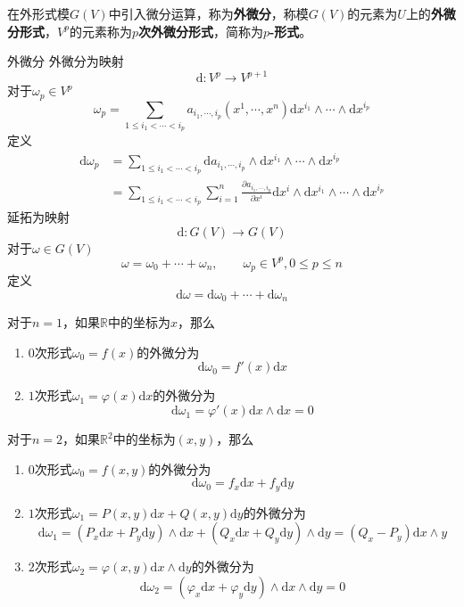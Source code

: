 \documentclass[lang = cn, scheme = chinese, thmcnt = section]{elegantbook}
\newcommand{\R}{\mathbb{R}}            %
\newcommand{\dd}{\mathrm{d}}           %
\begin{document}
在外形式模$G(V)$中引入微分运算，称为\textbf{外微分}，称模$G(V)$的元素为$U$上的\textbf{外微分形式}，$V^p$的元素称为\textbf{$p$次外微分形式}，简称为\textbf{$p$-形式}。

\begin{definition}{外微分}
	外微分为映射%
	$$
	\dd:V^p\to V^{p+1}
	$$
	对于$\omega_p\in V^p$%
	$$
	\omega_p=\sum_{1\le i_1<\cdots<i_p}a_{i_1,\cdots,i_p}(x^1,\cdots,x^n)\dd x^{i_1}\wedge\cdots\wedge\dd x^{i_p}
	$$
	定义%
	\begin{align*}
		\dd\omega_p
		& = \sum_{1\le i_1<\cdots<i_p}\dd a_{i_1,\cdots,i_p}\wedge\dd x^{i_1}\wedge\cdots\wedge\dd x^{i_p}\\
		& = \sum_{1\le i_1<\cdots<i_p}\sum_{i=1}^{n}\frac{\partial a_{i_1,\cdots,i_p}}{\partial x^i}\dd x^i\wedge\dd x^{i_1}\wedge\cdots\wedge\dd x^{i_p}
	\end{align*}
	延拓为映射
	$$
	\dd:G(V)\to G(V)
	$$
	对于$\omega\in G(V)$%
	$$
	\omega=\omega_0+\cdots+\omega_n,\qquad \omega_p\in V^p,0\le p \le n
	$$
	定义%
	$$
	\dd\omega=\dd\omega_0+\cdots+\dd\omega_n
	$$
\end{definition}

\begin{example}
	对于$n=1$，如果$\R$中的坐标为$x$，那么
	\begin{enumerate}
		\item $0$次形式$\omega_0=f(x)$的外微分为%
		$$
		\dd\omega_0=f'(x)\dd x
		$$
		\item $1$次形式$\omega_1=\varphi(x)\dd x$的外微分为%
		$$
		\dd\omega_1=\varphi'(x)\dd x\wedge\dd x=0
		$$
	\end{enumerate}
\end{example}

\begin{example}
	对于$n=2$，如果$\R^2$中的坐标为$(x,y)$，那么
	\begin{enumerate}
		\item $0$次形式$\omega_0=f(x,y)$的外微分为%
		$$
		\dd\omega_0=f_x\dd x+f_y\dd y
		$$
		\item $1$次形式$\omega_1=P(x,y)\dd x+Q(x,y)\dd y$的外微分为%
		$$
		\dd\omega_1
		=(P_x\dd x+P_y\dd y)\wedge \dd x+(Q_x\dd x+Q_y\dd y)\wedge\dd y
		=(Q_x-P_y)\dd x\wedge y
		$$
		\item $2$次形式$\omega_2=\varphi(x,y)\dd x\wedge\dd y$的外微分为%
		$$
		\dd\omega_2
		=(\varphi_x\dd x+\varphi_y\dd y)\wedge\dd x\wedge\dd y=0
		$$
	\end{enumerate}
\end{example}
\end{document}
